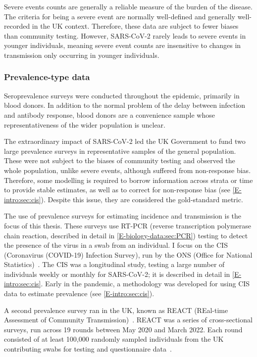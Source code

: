 \documentclass[thesis.tex]{subfiles}
\begin{document}
Severe events counts are generally a reliable measure of the burden of the disease.
The criteria for being a severe event are normally well-defined and generally well-recorded in the UK context.
Therefore, these data are subject to fewer biases than community testing.
However, SARS-CoV-2 rarely leads to severe events in younger individuals, meaning severe event counts are insensitive to changes in transmission only occurring in younger individuals.

\subsubsection{Prevalence-type data}

Seroprevalence surveys were conducted throughout the epidemic, primarily in blood donors.
In addition to the normal problem of the delay between infection and antibody response, blood donors are a convenience sample whose representativeness of the wider population is unclear.

The extraordinary impact of SARS-CoV-2 led the UK Government to fund two large prevalence surveys in representative samples of the general population.
These were not subject to the biases of community testing and observed the whole population, unlike severe events, although suffered from non-response bias.
Therefore, some modelling is required to borrow information across strata or time to provide stable estimates, as well as to correct for non-response bias (see \cref{E-intro:sec:cis}).
Despite this issue, they are considered the gold-standard metric.

The use of prevalence surveys for estimating incidence and transmission is the focus of this thesis.
These surveys use RT-PCR (reverse transcription polymerase chain reaction, described in detail in \cref{E-biology-data:sec:PCR}) testing to detect the presence of the virus in a swab from an individual.
I focus on the CIS (Coronavirus (COVID-19) Infection Survey), run by the ONS (Office for National Statistics)~\autocite{CIS,cisMethodsONS}.
The CIS was a longitudinal study, testing a large number of individuals weekly or monthly for SARS-CoV-2; it is described in detail in \cref{E-intro:sec:cis}.
Early in the pandemic, a methodology was developed for using CIS data to estimate prevalence (see \cref{E-intro:sec:cis}).

A second prevalence survey ran in the UK, known as REACT (REal-time Assessment of Community Transmission)~\autocite{rileyResurgence,rileyREACT}.
REACT was a series of cross-sectional surveys, run across 19 rounds between May 2020 and March 2022.
Each round consisted of at least 100,000 randomly sampled individuals from the UK contributing swabs for testing and questionnaire data~\autocite{elliottTwin}.
\end{document}
